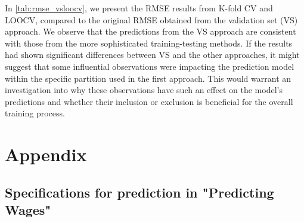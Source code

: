 \documentclass[12pt,a4paper,onecolumn]{article}
\begin{document}
In \autoref{tab:rmse_vsloocv}, we present the RMSE results from K-fold CV and LOOCV, compared to the original RMSE obtained from the validation set (VS) approach. We observe that the predictions from the VS approach are consistent with those from the more sophisticated training-testing methods. If the results had shown significant differences between VS and the other approaches, it might suggest that some influential observations were impacting the prediction model within the specific partition used in the first approach. This would warrant an investigation into why these observations have such an effect on the model’s predictions and whether their inclusion or exclusion is beneficial for the overall training process.





\section{Appendix}

\subsection{ Specifications for prediction in "Predicting Wages"}

\begingroup
\small
\setlength{\abovedisplayskip}{4pt}
\setlength{\belowdisplayskip}{4pt}
\setlength{\abovedisplayjot}{}
\setlength{\jot}{2pt}
\end{document}
